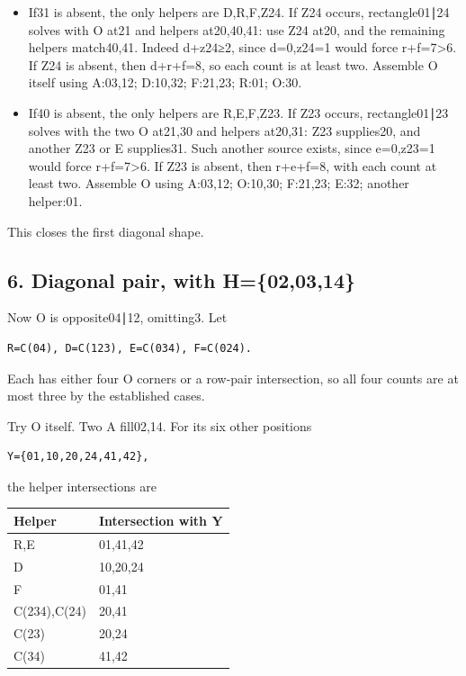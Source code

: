 \documentclass[
  10pt,
]{article}
\providecommand{\tightlist}{%
  \setlength{\itemsep}{0pt}\setlength{\parskip}{0pt}}
\begin{document}
\begin{itemize}
\tightlist
\item
  If31 is absent, the only helpers are D,R,F,Z24. If Z24 occurs,
  rectangle01∣24 solves with O at21 and helpers at20,40,41: use Z24
  at20, and the remaining helpers match40,41. Indeed d+z24≥2, since
  d=0,z24=1 would force r+f=7\textgreater6. If Z24 is absent, then
  d+r+f=8, so each count is at least two. Assemble O itself using
  A:03,12; D:10,32; F:21,23; R:01; O:30.
\item
  If40 is absent, the only helpers are R,E,F,Z23. If Z23 occurs,
  rectangle01∣23 solves with the two O at21,30 and helpers at20,31: Z23
  supplies20, and another Z23 or E supplies31. Such another source
  exists, since e=0,z23=1 would force r+f=7\textgreater6. If Z23 is
  absent, then r+e+f=8, with each count at least two. Assemble O using
  A:03,12; O:10,30; F:21,23; E:32; another helper:01.
\end{itemize}

This closes the first diagonal shape.

\hypertarget{diagonal-pair-with-h020314}{%
\subsection*{6. Diagonal pair, with
H=\{02,03,14\}}\label{diagonal-pair-with-h020314}}

Now O is opposite04∣12, omitting3. Let

\begin{verbatim}
R=C(04), D=C(123), E=C(034), F=C(024).
\end{verbatim}

Each has either four O corners or a row-pair intersection, so all four
counts are at most three by the established cases.

Try O itself. Two A fill02,14. For its six other positions

\begin{verbatim}
Y={01,10,20,24,41,42},
\end{verbatim}

the helper intersections are

\begin{longtable}[]{@{}ll@{}}
\toprule\noalign{}
Helper & Intersection with Y \\
\midrule\noalign{}
\endhead
\bottomrule\noalign{}
\endlastfoot
R,E & 01,41,42 \\
D & 10,20,24 \\
F & 01,41 \\
C(234),C(24) & 20,41 \\
C(23) & 20,24 \\
C(34) & 41,42 \\
\end{longtable}
\end{document}
